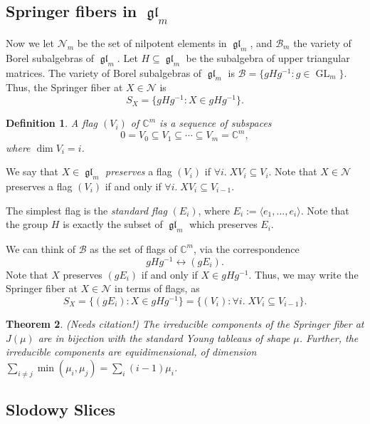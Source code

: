 \documentclass[12pt,psamsfonts]{article}
\DeclareMathOperator{\GL}{GL}
\DeclareMathOperator{\gl}{\mathfrak{gl}}
\newtheorem{theorem}{Theorem}[section]
\newtheorem{definition}[theorem]{Definition}
\begin{document}
\subsection{Springer fibers in \(\gl_m\)}
Now we let \(\mathcal{N}_m\) be the set of nilpotent elements in \(\gl_m\), and \(\mathcal{B}_m\) the variety of Borel subalgebras of \(\gl_m\).
Let \(H \subseteq \gl_m\) be the subalgebra of upper triangular matrices.
The variety of Borel subalgebras of \(\gl_m\) is \(\mathcal{B} = \{gHg^{-1} : g \in \GL_m\}\).
Thus, the Springer fiber at \(X \in \mathcal{N}\) is 
\[S_X = \{gHg^{-1} : X \in gHg^{-1}\}.\]
\begin{definition}
    A \emph{flag} \((V_i)\) of \(\mathbb{C}^m\) is a sequence of subspaces
    \[0 = V_0 \subseteq V_1 \subseteq \cdots \subseteq V_m = \mathbb{C}^m,\]
    where \(\dim V_i = i\).
\end{definition}
We say that \(X \in \gl_m\) \emph{preserves} a flag \((V_i)\) if \(\forall i. \; XV_i \subseteq V_i\).
Note that \(X \in \mathcal{N}\) preserves a flag \((V_i)\) if and only if \(\forall i. \; XV_i \subseteq V_{i - 1}\).
\par The simplest flag is the \emph{standard flag} \((E_i)\), where \(E_i := \langle e_1, ..., e_i \rangle\).
Note that the group \(H\) is exactly the subset of \(\gl_m\) which preserves \(E_i\).
\par We can think of \(\mathcal{B}\) as the set of flags of \(\mathbb{C}^m\), via the correspondence 
\[gHg^{-1} \leftrightarrow (gE_i).\]
Note that \(X\) preserves \((gE_i)\) if and only if \(X \in gHg^{-1}\).
Thus, we may write the Springer fiber at \(X \in \mathcal{N}\) in terms of flags, as 
\[S_X = \{(gE_i) : X \in gHg^{-1}\} = \{(V_i) : \forall i. \; XV_i \subseteq V_{i - 1}\}.\]

\begin{theorem}\label{usual_springer_fiber}
    (Needs citation!)
    The irreducible components of the Springer fiber at \(J(\mu)\) are in bijection with the standard Young tableaus of shape \(\mu\).
    Further, the irreducible components are equidimensional, of dimension \(\sum_{i \neq j} \min(\mu_i, \mu_j) = \sum_i (i - 1) \mu_i\).
\end{theorem}

\subsection{Slodowy Slices}
\end{document}
